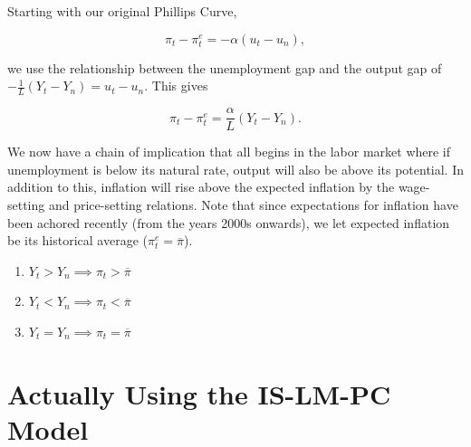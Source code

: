 \documentclass{extarticle}
\begin{document}
Starting with our original Phillips Curve,  


$$\pi_t - \pi^e_t = -\alpha (u_t - u_n),$$

we use the relationship between the unemployment gap and the output gap of $ -\frac{1}{L}(Y_t - Y_n) = u_t - u_n$. This gives  

$$\pi_t - \pi^e_t = \frac{\alpha}{L}(Y_t - Y_n).$$

We now have a chain of implication that all begins in the labor market where if unemployment is below its natural rate, output will also be above its potential. In addition to this, inflation will rise above the expected inflation by the wage-setting and price-setting relations. 
Note that since expectations for inflation have been achored recently (from the years 2000s onwards), we let expected inflation be its historical average ($\pi_t^e = \overline{\pi}$). 
\begin{enumerate}
  \item $Y_t > Y_n \implies \pi_t > \overline{\pi}$ 
  \item $Y_t < Y_n \implies \pi_t < \overline{\pi}$
  \item $Y_t = Y_n \implies \pi_t = \overline{\pi} $
\end{enumerate}



\section{Actually Using the IS-LM-PC Model}
\end{document}
